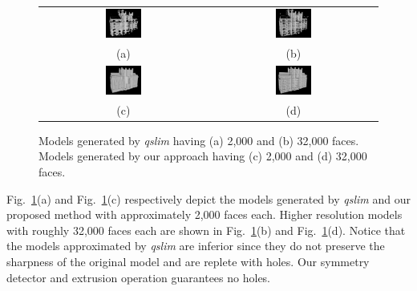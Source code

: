 \documentclass[10pt,journal,cspaper,compsoc]{IEEEtran}
\newcommand{\Figa}[1]{Fig.~\ref{fig:#1}(a)}
\newcommand{\Figb}[1]{Fig.~\ref{fig:#1}(b)}
\newcommand{\Figc}[1]{Fig.~\ref{fig:#1}(c)}
\newcommand{\Figd}[1]{Fig.~\ref{fig:#1}(d)}
\begin{document}
\begin{figure}[htbp]
\begin{center}
\begin{tabular}{cc}
\includegraphics[width=0.22\textwidth]{comp_32_2_qslim.png} &
\includegraphics[width=0.22\textwidth]{comp_4_2_qslim.png} \\
(a) & (b) \\
\includegraphics[width=0.22\textwidth]{comp_32_2.png} &
\includegraphics[width=0.22\textwidth]{comp_4_2.png} \\
(c) & (d)
\end{tabular}
\end{center}
\caption{
Models generated by {\it qslim} having (a) 2,000 and (b) 32,000 faces.
Models generated by our approach having (c) 2,000 and (d) 32,000 faces.}
\label{fig:TH_comp}
\end{figure}

\Figa{TH_comp} and \Figc{TH_comp} respectively depict the models generated
by {\it qslim} and our proposed method with approximately 2,000 faces each.
Higher resolution models with roughly 32,000 faces each are shown in
\Figb{TH_comp} and \Figd{TH_comp}.
Notice that the models approximated by {\it qslim} are inferior since they
do not preserve the sharpness of the original model and are replete with
holes. Our symmetry detector and extrusion operation guarantees no holes.
\end{document}
